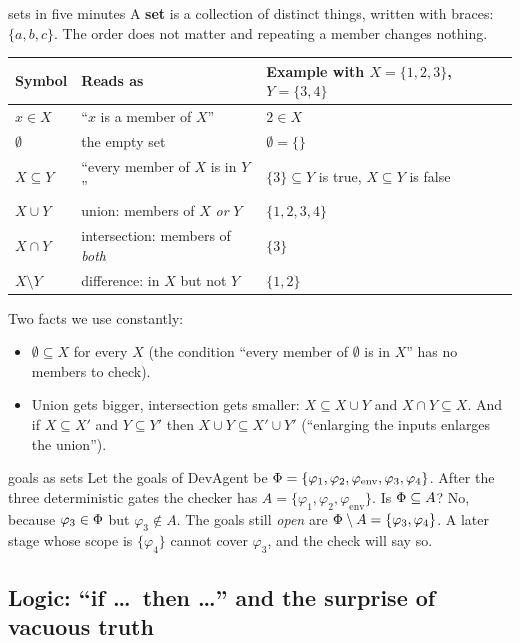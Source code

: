 \begin{toolbox}{sets in five minutes}
A \textbf{set} is a collection of distinct things, written with braces: $\{a,b,c\}$. The order does not matter and repeating a member changes nothing.

\smallskip
\begin{tabular}{@{}lll@{}}
\toprule
Symbol & Reads as & Example with $X=\{1,2,3\}$, $Y=\{3,4\}$\\
\midrule
$x\in X$ & ``$x$ is a member of $X$'' & $2\in X$\\
$\emptyset$ & the empty set & $\emptyset=\{\}$\\
$X\subseteq Y$ & ``every member of $X$ is in $Y$'' & $\{3\}\subseteq Y$ is true, $X\subseteq Y$ is false\\
$X\cup Y$ & union: members of $X$ \emph{or} $Y$ & $\{1,2,3,4\}$\\
$X\cap Y$ & intersection: members of \emph{both} & $\{3\}$\\
$X\setminus Y$ & difference: in $X$ but not $Y$ & $\{1,2\}$\\
\bottomrule
\end{tabular}

\smallskip
Two facts we use constantly:
\begin{itemize}
\item $\emptyset\subseteq X$ for every $X$ (the condition ``every member of $\emptyset$ is in $X$'' has no members to check).
\item Union gets bigger, intersection gets smaller: $X\subseteq X\cup Y$ and $X\cap Y\subseteq X$. And if $X\subseteq X'$ and $Y\subseteq Y'$ then $X\cup Y\subseteq X'\cup Y'$ (``enlarging the inputs enlarges the union'').
\end{itemize}
\end{toolbox}

\begin{example}{goals as sets}
Let the goals of DevAgent be $\Phi=\{\varphi_1,\varphi_2,\varphi_{\mathrm{env}},\varphi_3,\varphi_4\}$. After the three deterministic gates the checker has $A=\{\varphi_1,\varphi_2,\varphi_{\mathrm{env}}\}$. Is $\Phi\subseteq A$? No, because $\varphi_3\in\Phi$ but $\varphi_3\notin A$. The goals still \emph{open} are $\Phi\setminus A=\{\varphi_3,\varphi_4\}$. A later stage whose scope is $\{\varphi_4\}$ cannot cover $\varphi_3$, and the check will say so.
\end{example}

\subsection{Logic: ``if \dots\ then \dots'' and the surprise of vacuous truth}

